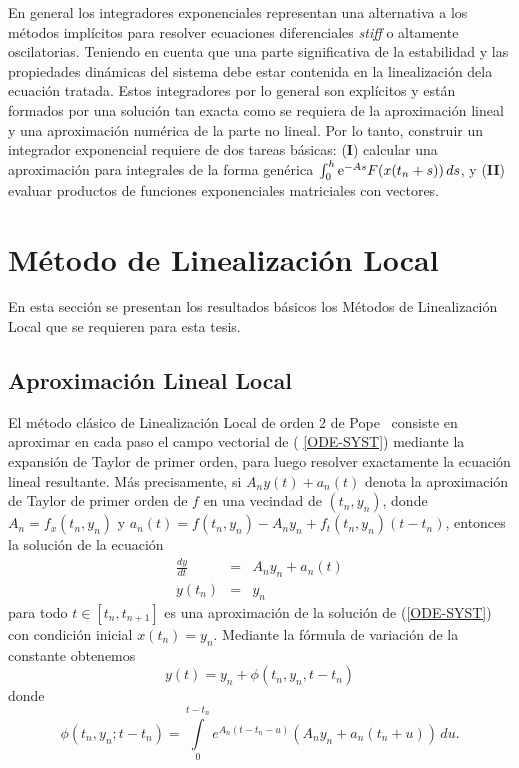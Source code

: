 En general los integradores exponenciales representan una alternativa a los métodos implícitos para resolver ecuaciones diferenciales \textit{stiff} o altamente oscilatorias. Teniendo en cuenta que una parte significativa de la estabilidad y las propiedades dinámicas del sistema debe estar contenida en la linealización dela ecuación tratada. Estos integradores por lo general son explícitos y están formados por una solución tan exacta como se requiera de la aproximación lineal y una aproximación numérica de la parte no lineal. Por lo tanto, construir un integrador exponencial requiere de dos tareas básicas: (\textbf{I}) calcular una aproximación para integrales de la forma 
genérica $\int_{0}^{h} \mathrm{e}^{-As}F(x(t_n+s)) \,ds$, y (\textbf{II}) evaluar productos de funciones exponenciales matriciales con vectores.


\section{Método de Linealización Local}\label{section:ll-methods}
En esta sección se presentan los resultados básicos los Métodos de Linealización Local que se requieren para esta tesis.

\subsection{Aproximación Lineal Local}

El método clásico de Linealización Local de orden 2 de Pope~\cite{pope1963exponential}
 consiste en aproximar en cada paso el campo vectorial de (%
\ref{ODE-SYST}) mediante la expansión de Taylor de primer orden, para
luego resolver exactamente la ecuación lineal resultante. Más
precisamente, si $A_{n}y(t)+a_{n}(t)$ denota la aproximación de Taylor
de primer orden de $f$ en una vecindad de $(t_n,y_{n})$, donde \mbox{$
	A_{n}=f_{x}(t_n,y_{n})$} y $a_{n}(t)=f(t_n,y_{n})-A_{n}y_{n}+f_t(t_n,y_n)(t-t_n)$, entonces la
solución de la ecuación 
\begin{eqnarray}
\frac{dy}{dt} & = & A_{n}y_n+a_{n}(t) \label{ODE-SYST-LINEAL-1} \\
y(t_{n})& = & y_{n}  \nonumber
\end{eqnarray}
para todo $t\in[t_{n},t_{n+1}]$ es una aproximación de la solución
de (\ref{ODE-SYST}) con condición inicial \mbox{$x(t_{n})=y_{n}$}. Mediante la fórmula de variación de la constante obtenemos 
\begin{equation}
y(t)=y_{n}+\phi(t_{n},y_{n},t-t_{n})  \label{ODE-SYST-FORM-LL}
\end{equation}
donde 
\begin{equation*}
\phi(t_{n},y_{n};t-t_{n})=\int\limits^{t-t_{n}}_{0} e^{{A_{n}(t-t_{n}-u)}}
(A_{n}y_{n}+a_{n}(t_{n}+u))\,du.  %
\end{equation*}

